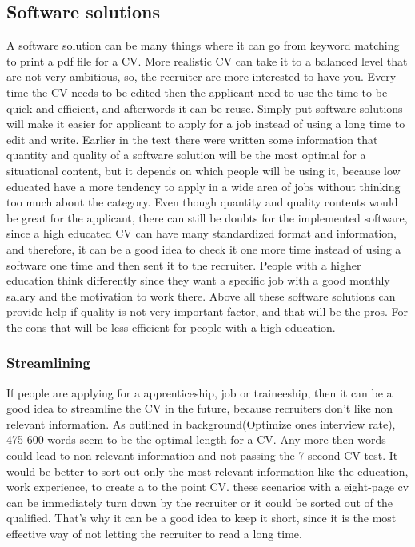 \subsection{Software solutions}
A software solution can be many things where it can go from keyword matching to print a pdf file for a CV.
More realistic CV can take it to a balanced level that are not very ambitious, 
so, the recruiter are more interested to have you. Every time the CV needs to be edited
then the applicant need to use the time to be quick and efficient, and afterwords it can be reuse.
Simply put software solutions will make it easier for applicant to apply for a job instead of using a long time to edit and write. 
Earlier in the text there were written some information 
that quantity and quality of a software solution will be the most optimal for a situational content,
but it depends on which people will be using it, because low educated have a more tendency to apply
in a wide area of jobs without thinking too much about the category. 
Even though quantity and quality contents would be great for the applicant, 
there can still be doubts for the implemented software, since a high educated CV can have many standardized format and information,
and therefore, it can be a good idea to check it one more time instead of using a software one time and then sent it to the recruiter.
People with a higher education think differently since they want a specific job
with a good monthly salary and the motivation to work there. 
Above all these software solutions can provide help if quality is not very important factor,
and that will be the pros. For the cons that will be less efficient for people with a high education.

\subsubsection{Streamlining}
If people are applying for a apprenticeship, job or traineeship, 
then it can be a good idea to streamline the CV in the future, because recruiters don't like non relevant information.
As outlined in background(Optimize ones interview rate), 475-600 words seem to be the optimal length for a CV.
Any more then words could lead to non-relevant information and not passing the 7 second CV test.
It would be better to sort out only the most relevant information 
like the education, work experience, to create a to the point CV. 
these scenarios with a eight-page cv can be immediately turn down by the recruiter or 
it could be sorted out of the qualified.
That's why it can be a good idea to keep it short, 
since it is the most effective way of not letting the recruiter to read a long time.

